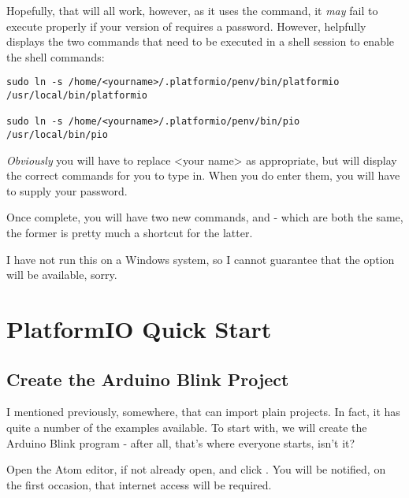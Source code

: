 Hopefully, that will all work, however, as it uses the  command, it \emph{may} fail to execute properly if your version of  requires a password. However,  helpfully displays the two commands that need to be executed in a shell session to enable the shell commands:

\begin{lstlisting}[caption={Install PlatformIO Shell Commands Manually}]
sudo ln -s /home/<yourname>/.platformio/penv/bin/platformio /usr/local/bin/platformio

sudo ln -s /home/<yourname>/.platformio/penv/bin/pio /usr/local/bin/pio
\end{lstlisting}

\emph{Obviously} you will have to replace <your name> as appropriate, but  will display the correct commands for you to type in. When you do enter them, you will have to supply your  password.

Once complete, you will have two new commands,  and  - which are both the same, the former is pretty much a shortcut for the latter.

\begin{note}
	I have not run this on a Windows system, so I cannot guarantee that the option will be available, sorry.
\end{note}

\section{PlatformIO Quick Start}\label{platformio-quick-start}

\subsection{Create the Arduino Blink Project}\label{create-the-arduino-blink-project}

I mentioned previously, somewhere, that  can import plain   projects. In fact, it has quite a number of the   examples available. To start with, we will create the Arduino Blink program - after all, that's where everyone starts, isn't it?

Open the Atom editor, if not already open, and click . You will be notified, on the first occasion, that internet access will be required.

